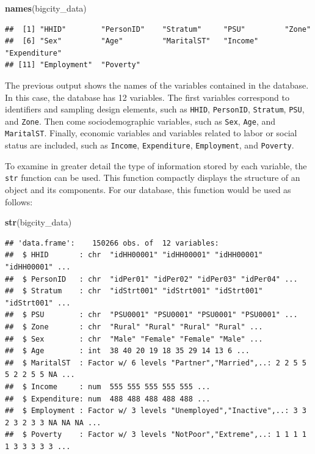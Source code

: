 \documentclass[
  english,
  12pt,
]{book}
\newenvironment{Shaded}{\begin{snugshade}}{\end{snugshade}}
\newcommand{\FunctionTok}[1]{\textcolor[rgb]{0.13,0.29,0.53}{\textbf{#1}}}
\newcommand{\NormalTok}[1]{#1}
\begin{document}
\begin{Shaded}
\begin{Highlighting}[]
\FunctionTok{names}\NormalTok{(bigcity\_data)}
\end{Highlighting}
\end{Shaded}

\begin{verbatim}
##  [1] "HHID"        "PersonID"    "Stratum"     "PSU"         "Zone"       
##  [6] "Sex"         "Age"         "MaritalST"   "Income"      "Expenditure"
## [11] "Employment"  "Poverty"
\end{verbatim}

The previous output shows the names of the variables contained in the database. In this case, the database has 12 variables. The first variables correspond to identifiers and sampling design elements, such as \texttt{HHID}, \texttt{PersonID}, \texttt{Stratum}, \texttt{PSU}, and \texttt{Zone}. Then come sociodemographic variables, such as \texttt{Sex}, \texttt{Age}, and \texttt{MaritalST}. Finally, economic variables and variables related to labor or social status are included, such as \texttt{Income}, \texttt{Expenditure}, \texttt{Employment}, and \texttt{Poverty}.

To examine in greater detail the type of information stored by each variable, the \texttt{str} function can be used. This function compactly displays the structure of an object and its components. For our database, this function would be used as follows:

\begin{Shaded}
\begin{Highlighting}[]
\FunctionTok{str}\NormalTok{(bigcity\_data)}
\end{Highlighting}
\end{Shaded}

\begin{verbatim}
## 'data.frame':    150266 obs. of  12 variables:
##  $ HHID       : chr  "idHH00001" "idHH00001" "idHH00001" "idHH00001" ...
##  $ PersonID   : chr  "idPer01" "idPer02" "idPer03" "idPer04" ...
##  $ Stratum    : chr  "idStrt001" "idStrt001" "idStrt001" "idStrt001" ...
##  $ PSU        : chr  "PSU0001" "PSU0001" "PSU0001" "PSU0001" ...
##  $ Zone       : chr  "Rural" "Rural" "Rural" "Rural" ...
##  $ Sex        : chr  "Male" "Female" "Female" "Male" ...
##  $ Age        : int  38 40 20 19 18 35 29 14 13 6 ...
##  $ MaritalST  : Factor w/ 6 levels "Partner","Married",..: 2 2 5 5 5 2 2 5 5 NA ...
##  $ Income     : num  555 555 555 555 555 ...
##  $ Expenditure: num  488 488 488 488 488 ...
##  $ Employment : Factor w/ 3 levels "Unemployed","Inactive",..: 3 3 2 3 2 3 3 NA NA NA ...
##  $ Poverty    : Factor w/ 3 levels "NotPoor","Extreme",..: 1 1 1 1 1 3 3 3 3 3 ...
\end{verbatim}
\end{document}

